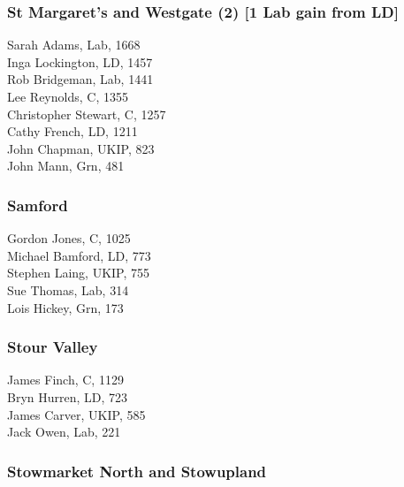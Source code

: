 \documentclass[a4paper,openany,10pt]{book}
\begin{document}
\subsubsection*{St Margaret's and Westgate (2) \hspace*{\fill}\nolinebreak[1]%
\enspace\hspace*{\fill}
[1 Lab gain from LD]}



Sarah Adams, Lab, 1668\\
Inga Lockington, LD, 1457\\
Rob Bridgeman, Lab, 1441\\
Lee Reynolds, C, 1355\\
Christopher Stewart, C, 1257\\
Cathy French, LD, 1211\\
John Chapman, UKIP, 823\\
John Mann, Grn, 481\\


\subsubsection*{Samford}



Gordon Jones, C, 1025\\
Michael Bamford, LD, 773\\
Stephen Laing, UKIP, 755\\
Sue Thomas, Lab, 314\\
Lois Hickey, Grn, 173\\


\subsubsection*{Stour Valley}



James Finch, C, 1129\\
Bryn Hurren, LD, 723\\
James Carver, UKIP, 585\\
Jack Owen, Lab, 221\\


\subsubsection*{Stowmarket North and Stowupland}
\end{document}
